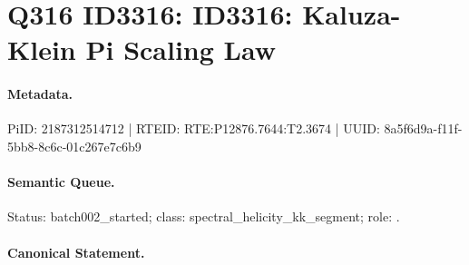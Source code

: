 \section*{Q316 ID3316: ID3316: Kaluza-Klein Pi Scaling Law}
\paragraph{Metadata.}
PiID: 2187312514712 | RTEID: RTE:P12876.7644:T2.3674 | UUID: 8a5f6d9a-f11f-5bb8-8c6c-01c267e7c6b9

\paragraph{Semantic Queue.}
Status: batch002\_started; class: spectral\_helicity\_kk\_segment; role: .

\paragraph{Canonical Statement.}
